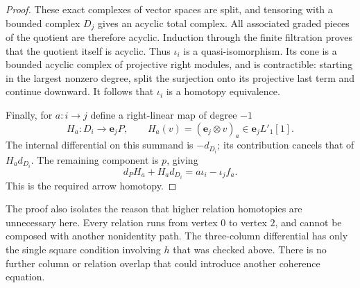 \begin{proof}
These exact complexes of vector spaces are split, and tensoring
with a bounded complex \(D_j\) gives an acyclic total complex.
All associated graded pieces of the quotient are therefore acyclic.
Induction through the finite filtration proves that the quotient
itself is acyclic.  Thus \(\iota_i\) is a quasi-isomorphism.
Its cone is a bounded acyclic complex of projective right modules,
and is contractible: starting in the largest nonzero degree, split
the surjection onto its projective last term and continue downward.
It follows that \(\iota_i\) is a homotopy equivalence.

Finally, for \(a:i\to j\) define a right-linear map of degree \(-1\)
\[
 H_a:D_i\longrightarrow\mathbf e_jP,\qquad
 H_a(v)=(\mathbf e_j\otimes v)_a
          \in\mathbf e_jL'_1[1].
\]
The internal differential on this summand is \(-d_{D_i}\);
its contribution cancels that of \(H_ad_{D_i}\).  The remaining
component is \(p\), giving
\[
 d_PH_a+H_ad_{D_i}
   =a\iota_i-\iota_jf_a .
\]
This is the required arrow homotopy.
\end{proof}

\begin{remark}
The proof also isolates the reason that higher relation homotopies
are unnecessary here.  Every relation runs from vertex \(0\) to
vertex \(2\), and cannot be composed with another nonidentity path.
The three-column differential has only the single square condition
involving \(h\) that was checked above.  There is no further column
or relation overlap that could introduce another coherence equation.
\end{remark}

